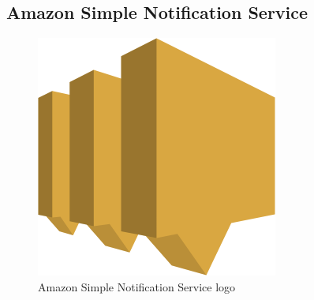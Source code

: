 \subsection*{Amazon Simple Notification Service} \label{sns}

\begin{figure}[H]
\centering
\includegraphics[scale=0.1]{resources/sns-logo.png}
\caption{Amazon Simple Notification Service logo}
\end{figure}





